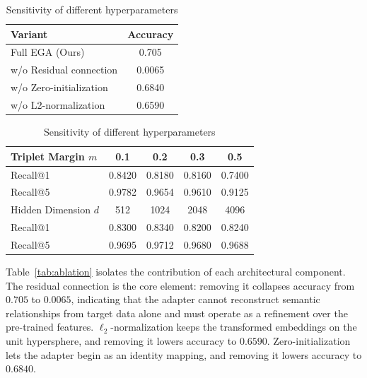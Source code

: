 \documentclass{article}
\begin{document}
\begin{table}[t]
		\vspace{-1em}
	\centering
	\begin{minipage}{0.38\textwidth}
		\centering
		\caption{Ablation study of EGA}
		\label{tab:ablation}
		\small
		\begin{tabular}{lc}
			\hline
			Variant                 & Accuracy \\ \hline
			Full EGA (Ours)         & 0.705    \\
			w/o Residual connection & 0.0065   \\
			w/o Zero-initialization & 0.6840   \\
			w/o L2-normalization    & 0.6590   \\ \hline
		\end{tabular}
	\end{minipage}
	\hfill
	\begin{minipage}{0.61\textwidth}
		\centering
		\caption{Sensitivity of different hyperparameters}
		\label{tab:sensitivity}
		\small
		\begin{tabular}{lcccc}
			\hline
			Triplet Margin $m$   & 0.1    & 0.2    & 0.3    & 0.5    \\ \hline
			Recall@1             & 0.8420 & 0.8180 & 0.8160 & 0.7400 \\
			Recall@5             & 0.9782 & 0.9654 & 0.9610 & 0.9125 \\ \hline
			Hidden Dimension $d$ & 512    & 1024   & 2048   & 4096   \\ \hline
			Recall@1             & 0.8300 & 0.8340 & 0.8200 & 0.8240 \\
			Recall@5             & 0.9695 & 0.9712 & 0.9680 & 0.9688 \\ \hline
		\end{tabular}
	\end{minipage}
	\vspace{-1em}
\end{table}

Table~\ref{tab:ablation} isolates the contribution of each architectural component.
The residual connection is the core element: removing it collapses accuracy from $0.705$ to $0.0065$, indicating that the adapter cannot reconstruct semantic relationships from target data alone and must operate as a refinement over the pre-trained features.
$\ell_2$-normalization keeps the transformed embeddings on the unit
hypersphere, and removing it lowers accuracy to $0.6590$.
Zero-initialization lets the adapter begin as an identity mapping, and removing it lowers accuracy to $0.6840$.
\end{document}
